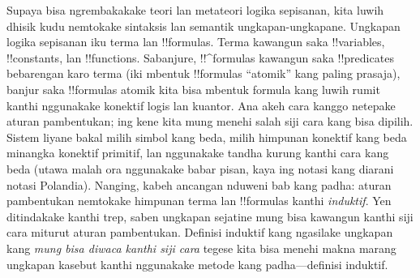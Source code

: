 \documentclass[../../../include/open-logic-section]{subfiles}
\begin{document}


Supaya bisa ngrembakakake teori lan metateori logika sepisanan, kita
luwih dhisik kudu nemtokake sintaksis lan semantik ungkapan-ungkapane.
Ungkapan logika sepisanan iku terma lan !!{formula}s. Terma kawangun saka
!!{variable}s, !!{constant}s, lan !!{function}s. Sabanjure,
!!^{formula}s kawangun saka !!{predicate}s bebarengan karo terma
(iki mbentuk !!{formula}s ``atomik'' kang paling prasaja), banjur saka
!!{formula}s atomik kita bisa mbentuk formula kang luwih rumit kanthi
nggunakake konektif logis lan kuantor. Ana akeh cara kanggo netepake
aturan pambentukan; ing kene kita mung menehi salah siji cara kang
bisa dipilih. Sistem liyane bakal milih simbol kang beda, milih
himpunan konektif kang beda minangka konektif primitif, lan nggunakake
tandha kurung kanthi cara kang beda (utawa malah ora nggunakake babar
pisan, kaya ing notasi kang diarani notasi Polandia). Nanging, kabeh ancangan nduweni bab kang
padha: aturan pambentukan nemtokake himpunan terma lan !!{formula}s
kanthi \emph{induktif}. Yen ditindakake kanthi trep, saben ungkapan
sejatine mung bisa kawangun kanthi siji cara miturut aturan pambentukan.
Definisi induktif kang ngasilake ungkapan kang \emph{mung bisa diwaca
kanthi siji cara} tegese kita bisa menehi makna marang ungkapan kasebut
kanthi nggunakake metode kang padha---definisi induktif.
\end{document}
